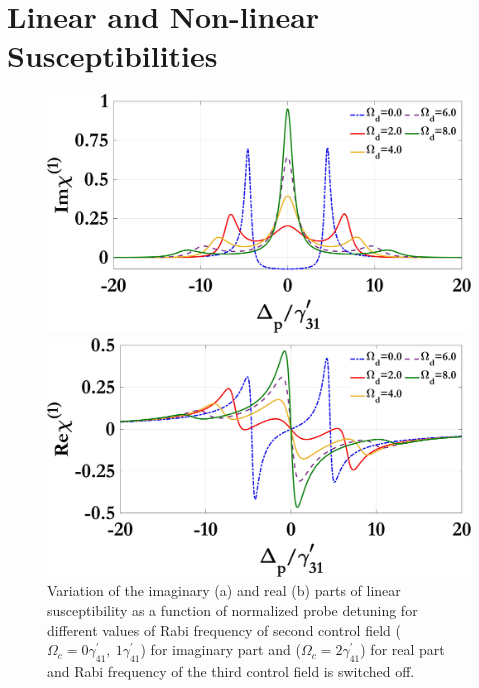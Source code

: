 \documentclass[12pt,a4paper]{article}
\begin{document}
\section{Linear and Non-linear Susceptibilities}

\noindent
\begin{figure}[h]
  \centering
  \begin{minipage}[t]{0.48\textwidth}
    \centering
    \includegraphics[width=\linewidth]{Plots/Img_chi1_Omega_d.jpeg}
    \subcaption{}
  \end{minipage}%
  \hfill
  \begin{minipage}[t]{0.48\textwidth}
    \centering
    \includegraphics[width=\linewidth]{Plots/Real_chi1_Omega_d.jpeg}
    \subcaption{}
  \end{minipage}
  \caption{Variation of the imaginary (a) and real (b) parts of linear susceptibility as a function of normalized probe detuning for different values of Rabi frequency of second control field ($\Omega_c=0\gamma^{\prime}_{41},\ 1\gamma^{\prime}_{41}$) for imaginary part and ($\Omega_c=2\gamma^{\prime}_{41}$) for real part and Rabi frequency of the third control field is switched off.}
  \label{fig:omegad}
\end{figure}
\end{document}
